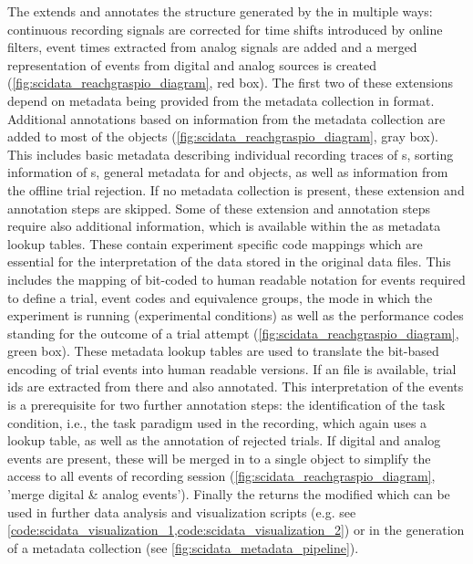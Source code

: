 The  extends and annotates the  structure generated by the  in multiple ways: continuous recording signals are corrected for time shifts introduced by online filters, event times extracted from analog signals are added and a merged representation of events from digital and analog sources is created (\cref{fig:scidata_reachgraspio_diagram}, red box). The first two of these extensions depend on metadata being provided from the metadata collection in  format. Additional annotations based on information from the metadata collection are added to most of the  objects (\cref{fig:scidata_reachgraspio_diagram}, gray box). This includes basic metadata describing individual recording traces of s, sorting information of s, general metadata for  and  objects, as well as information from the offline trial rejection. If no  metadata collection is present, these extension and annotation steps are skipped.
Some of these extension and annotation steps require also additional information, which is available within the  as metadata lookup tables. These contain experiment specific code mappings which are essential for the interpretation of the data stored in the original  data files. This includes the mapping of bit-coded to human readable notation for events required to define a trial, event codes and equivalence groups, the mode in which the experiment is running (experimental conditions) as well as the performance codes standing for the outcome of a trial attempt (\cref{fig:scidata_reachgraspio_diagram}, green box). These metadata lookup tables are used to translate the bit-based encoding of trial events into human readable versions. If an  file is available, trial ids are extracted from there and also annotated. This interpretation of the events is a prerequisite for two further annotation steps: the identification of the task condition, i.e., the task paradigm used in the recording, which again uses a  lookup table, as well as the annotation of rejected trials. If digital and analog events are present, these will be merged in to a single  object to simplify the access to all events of recording session (\cref{fig:scidata_reachgraspio_diagram}, 'merge digital \& analog events'). Finally the  returns the modified  which can be used in further data analysis and visualization scripts (e.g. see \cref{code:scidata_visualization_1,code:scidata_visualization_2}) or in the generation of a metadata collection (see \cref{fig:scidata_metadata_pipeline}).

